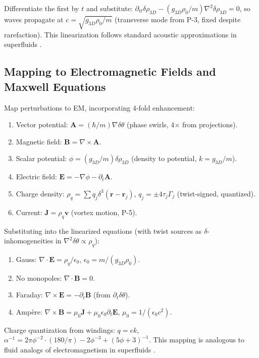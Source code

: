 \documentclass{article}
\begin{document}
Differentiate the first by $t$ and substitute: $\partial_{tt} \delta \rho_{3D} - (g_{3D} \rho_0 / m) \nabla^2 \delta \rho_{3D} = 0$, so waves propagate at $c = \sqrt{g_{3D} \rho_0 / m}$ (transverse mode from P-3, fixed despite rarefaction). This linearization follows standard acoustic approximations in superfluids \cite{garay2000sonic}.

\subsection{Mapping to Electromagnetic Fields and Maxwell Equations}

Map perturbations to EM, incorporating 4-fold enhancement:

\begin{enumerate}
\item Vector potential: $\mathbf{A} = (\hbar / m) \nabla \delta \theta$ (phase swirls, 4$\times$ from projections).
\item Magnetic field: $\mathbf{B} = \nabla \times \mathbf{A}$.
\item Scalar potential: $\phi = (g_{3D} / m) \delta \rho_{3D}$ (density to potential, $k = g_{3D}/m$).
\item Electric field: $\mathbf{E} = -\nabla \phi - \partial_t \mathbf{A}$.
\item Charge density: $\rho_q = \sum q_j \delta^3(\mathbf{r} - \mathbf{r}_j)$, $q_j = \pm 4 \tau_j \Gamma_j$ (twist-signed, quantized).
\item Current: $\mathbf{J} = \rho_q \mathbf{v}$ (vortex motion, P-5).
\end{enumerate}

Substituting into the linearized equations (with twist sources as $\delta$-inhomogeneities in $\nabla^2 \delta \theta \propto \rho_q$):

\begin{enumerate}
\item Gauss: $\nabla \cdot \mathbf{E} = \rho_q / \epsilon_0$, $\epsilon_0 = m / (g_{3D} \rho_0)$.
\item No monopoles: $\nabla \cdot \mathbf{B} = 0$.
\item Faraday: $\nabla \times \mathbf{E} = -\partial_t \mathbf{B}$ (from $\partial_t \delta \theta$).
\item Ampère: $\nabla \times \mathbf{B} = \mu_0 \mathbf{J} + \mu_0 \epsilon_0 \partial_t \mathbf{E}$, $\mu_0 = 1 / ( \epsilon_0 c^2 )$.
\end{enumerate}

Charge quantization from windings: $q = e k$, $\alpha^{-1} = 2\pi \phi^{-2} \cdot (180/\pi) - 2 \phi^{-3} + (5 \phi + 3)^{-1}$. This mapping is analogous to fluid analogs of electromagnetism in superfluids \cite{simula2020gravitational}.
\end{document}
